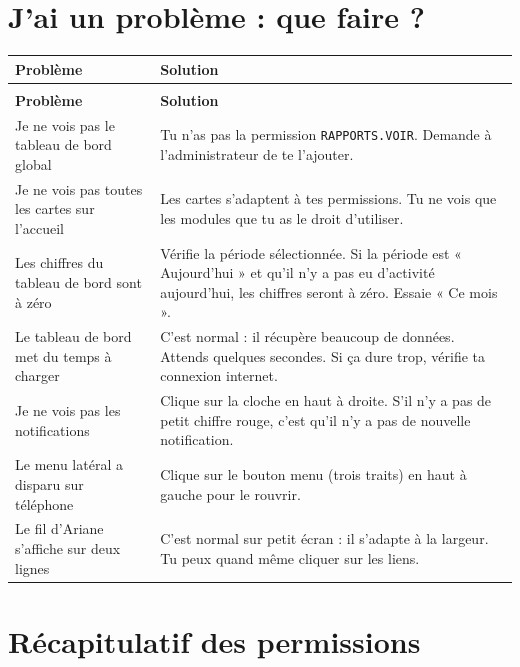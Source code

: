 \documentclass[12pt,a4paper]{article}
\begin{document}
\newpage

\section{J'ai un problème : que faire ?}

\begin{longtable}{>{\raggedright}p{5cm} p{9cm}}
\toprule
\textbf{Problème} & \textbf{Solution} \\
\midrule
\endfirsthead
\multicolumn{2}{c}{\textit{Suite de la FAQ}} \\
\toprule
\textbf{Problème} & \textbf{Solution} \\
\midrule
\endhead
\bottomrule
\endfoot

Je ne vois pas le tableau de bord global & Tu n'as pas la permission \texttt{RAPPORTS.VOIR}. Demande à l'administrateur de te l'ajouter. \\

Je ne vois pas toutes les cartes sur l'accueil & Les cartes s'adaptent à tes permissions. Tu ne vois que les modules que tu as le droit d'utiliser. \\

Les chiffres du tableau de bord sont à zéro & Vérifie la période sélectionnée. Si la période est « Aujourd'hui » et qu'il n'y a pas eu d'activité aujourd'hui, les chiffres seront à zéro. Essaie « Ce mois ». \\

Le tableau de bord met du temps à charger & C'est normal : il récupère beaucoup de données. Attends quelques secondes. Si ça dure trop, vérifie ta connexion internet. \\

Je ne vois pas les notifications & Clique sur la cloche en haut à droite. S'il n'y a pas de petit chiffre rouge, c'est qu'il n'y a pas de nouvelle notification. \\

Le menu latéral a disparu sur téléphone & Clique sur le bouton menu (trois traits) en haut à gauche pour le rouvrir. \\

Le fil d'Ariane s'affiche sur deux lignes & C'est normal sur petit écran : il s'adapte à la largeur. Tu peux quand même cliquer sur les liens. \\

\bottomrule
\end{longtable}

\newpage

\section{Récapitulatif des permissions}
\end{document}
